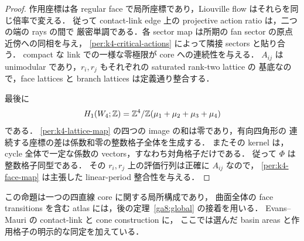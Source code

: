 \begin{proof}
作用座標は各 regular face で局所座標であり，Liouville flow はそれらを同じ倍率で変える．
従って contact-link edge 上の projective action ratio は，二つの端の rays の間で
厳密単調である．各 sector map は所期の fan sector の原点近傍への同相を与え，
\eqref{per:k4-critical-actions} によって隣接 sectors と貼り合う．
compact な link での一様な零極限が core への連続性を与える．
$A_{ij}$ は unimodular であり，$r_i,r_j$ もそれぞれの saturated rank-two lattice の
基底なので，face lattices と branch lattices は定義通り整合する．

最後に
\[
 H_1(W_4;\mathbb Z)=\mathbb Z^4/\mathbb Z(\mu_1+\mu_2+\mu_3+\mu_4)
\]
である\cite{Hattori,PapadimaSuciu}．
\eqref{per:k4-lattice-map} の四つの image の和は零であり，有向四角形の
連続する座標の差は係数和零の整数格子全体を生成する．
またその kernel は，cycle 全体で一定な係数の vectors，すなわち対角格子だけである．
従って $\Phi$ は整数格子同型である．
その $r_i,r_j$ 上の評価行列は正確に $A_{ij}$ なので，
\eqref{per:k4-face-map} は主張した linear-period 整合性を与える．
\end{proof}

この命題は一つの四直線 core に関する局所構成であり，
曲面全体の face transitions を含む atlas には，後の定理~\ref{ga8:global} の接着を用いる．
Evans--Mauri の contact-link と cone construction \cite{EM} に，
ここでは選んだ basin areas と作用格子の明示的な同定を加えている．

